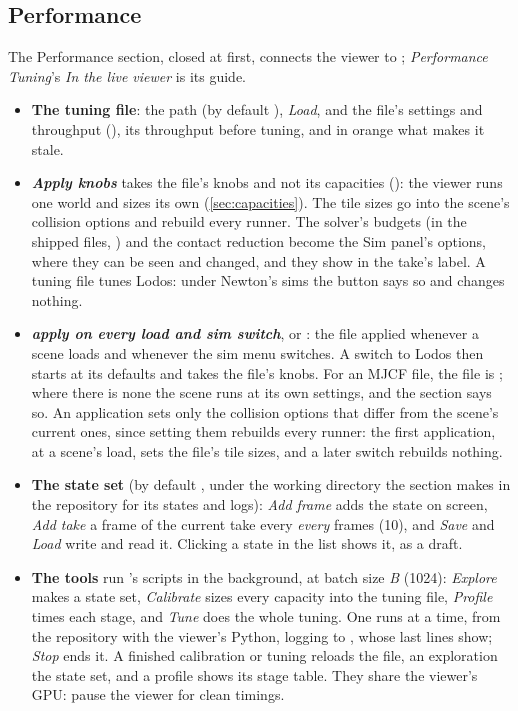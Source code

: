 \subsection{Performance}\label{sec:performance}

The Performance section, closed at first, connects the viewer to ; \emph{Performance Tuning}'s \emph{In the live viewer} is its guide.

\begin{itemize}
\item \textbf{The tuning file}: the path (by default ), \emph{Load}, and the file's settings and throughput (), its throughput before tuning, and in orange what makes it stale.
\item \textbf{\emph{Apply knobs}} takes the file's knobs and not its capacities (): the viewer runs one world and sizes its own (\cref{sec:capacities}). The tile sizes go into the scene's collision options and rebuild every runner. The solver's budgets (in the shipped files, ) and the contact reduction become the Sim panel's options, where they can be seen and changed, and they show in the take's label. A tuning file tunes Lodos: under Newton's sims the button says so and changes nothing.
\item \textbf{\emph{apply on every load and sim switch}}, or : the file applied whenever a scene loads and whenever the sim menu switches. A switch to Lodos then starts at its defaults and takes the file's knobs. For an MJCF file, the file is ; where there is none the scene runs at its own settings, and the section says so. An application sets only the collision options that differ from the scene's current ones, since setting them rebuilds every runner: the first application, at a scene's load, sets the file's tile sizes, and a later switch rebuilds nothing.
\item \textbf{The state set} (by default , under the working directory  the section makes in the repository for its states and logs): \emph{Add frame} adds the state on screen, \emph{Add take} a frame of the current take every \emph{every} frames (10), and \emph{Save} and \emph{Load} write and read it. Clicking a state in the list shows it, as a draft.
\item \textbf{The tools} run 's scripts in the background, at batch size \emph{B} (1024): \emph{Explore} makes a state set, \emph{Calibrate} sizes every capacity into the tuning file, \emph{Profile} times each stage, and \emph{Tune} does the whole tuning. One runs at a time, from the repository with the viewer's Python, logging to , whose last lines show; \emph{Stop} ends it. A finished calibration or tuning reloads the file, an exploration the state set, and a profile shows its stage table. They share the viewer's GPU: pause the viewer for clean timings.

\end{itemize}
